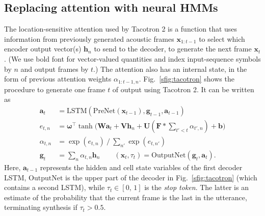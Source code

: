 \documentclass[british]{article}
\newcommand{\bb}[1]{\boldsymbol{#1}}
\newcommand{\seq}[1]{#1} \newcommand{\est}[1]{\widehat{#1}}
\newcommand{\x}{\boldsymbol{x}}
\newcommand{\xseq}{\seq{\x}}
\newcommand{\topdecoder}{OutputNet}
\begin{document}
\subsection{Replacing attention with neural HMMs}
\label{ssec:neuralhmm}
The location-sensitive attention \cite{chorowski2015attention} used by Tacotron 2 is a function that uses information from previously generated acoustic frames $\xseq_{1:t-1}$ to 
select which encoder output vector(s) $\bb{h}_n$ to send to the decoder, to generate the next frame $\x_t$.
(We use bold font for vector-valued quantities and index input-sequence symbols by $n$ and output frames by $t$.)
The attention also has an internal state, in the form of previous attention weights $\alpha_{1:t-1,n}$.
Fig.\ \ref{sfig:tacotron} shows the procedure to generate one frame $t$ of output using Tacotron 2. It can be written as
\begin{align}
\bb{a}_t & = \mathrm{LSTM}(\mathrm{PreNet}(\x_{t-1}),\bb{g}_{t-1},\bb{a}_{t-1}) \label{eq:decoder1}\\
e_{t,n} & = \bb{\omega}^{\intercal} \tanh\big(\bb{W}\bb{a}_t + \bb{V}\bb{h}_n + \bb{U}(\bb{F}\ast\textstyle{\sum_{t'<t}}\alpha_{t',n}) + \bb{b}\big) \label{eq:decoder2}\\
\alpha_{t,n} & = \exp(e_{t,n}) \mathbin{/} \textstyle{\sum_{n'}} \exp(e_{t,n'}) \\
\bb{g}_t & = \textstyle{\sum_{n}} \alpha_{t,n} \bb{h}_n \qquad{}(\x_t,\tau_t) = \mathrm{\topdecoder{}}(\bb{g}_t,\bb{a}_t) \label{eq:decoderlast} 
\text{.}
\end{align}
Here, $\bb{a}_{t-1}$ represents the hidden and cell state variables of the first decoder LSTM, $\mathrm{\topdecoder{}}$ is the upper part of the decoder in Fig.\ \ref{sfig:tacotron} (which contains a second LSTM), while $\tau_t\in[0,\,1]$ is the \emph{stop token}.
The latter is an estimate of the probability that the current frame is the last in the utterance, terminating synthesis if $\tau_t>0.5$.
\end{document}
